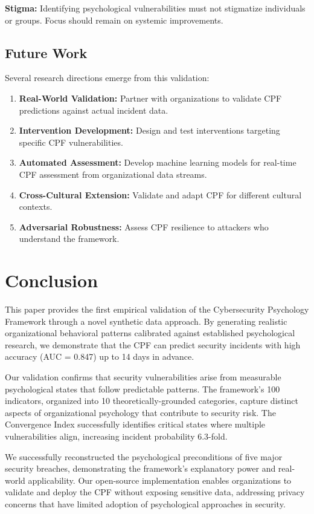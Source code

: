 \documentclass[10pt,twocolumn]{IEEEtran}
\begin{document}
\textbf{Stigma:} Identifying psychological vulnerabilities must not stigmatize individuals or groups. Focus should remain on systemic improvements.

\subsection{Future Work}

Several research directions emerge from this validation:

\begin{enumerate}
\item \textbf{Real-World Validation:} Partner with organizations to validate CPF predictions against actual incident data.
\item \textbf{Intervention Development:} Design and test interventions targeting specific CPF vulnerabilities.
\item \textbf{Automated Assessment:} Develop machine learning models for real-time CPF assessment from organizational data streams.
\item \textbf{Cross-Cultural Extension:} Validate and adapt CPF for different cultural contexts.
\item \textbf{Adversarial Robustness:} Assess CPF resilience to attackers who understand the framework.
\end{enumerate}

\section{Conclusion}

This paper provides the first empirical validation of the Cybersecurity Psychology Framework through a novel synthetic data approach. By generating realistic organizational behavioral patterns calibrated against established psychological research, we demonstrate that the CPF can predict security incidents with high accuracy (AUC = 0.847) up to 14 days in advance.

Our validation confirms that security vulnerabilities arise from measurable psychological states that follow predictable patterns. The framework's 100 indicators, organized into 10 theoretically-grounded categories, capture distinct aspects of organizational psychology that contribute to security risk. The Convergence Index successfully identifies critical states where multiple vulnerabilities align, increasing incident probability 6.3-fold.

We successfully reconstructed the psychological preconditions of five major security breaches, demonstrating the framework's explanatory power and real-world applicability. Our open-source implementation enables organizations to validate and deploy the CPF without exposing sensitive data, addressing privacy concerns that have limited adoption of psychological approaches in security.
\end{document}
